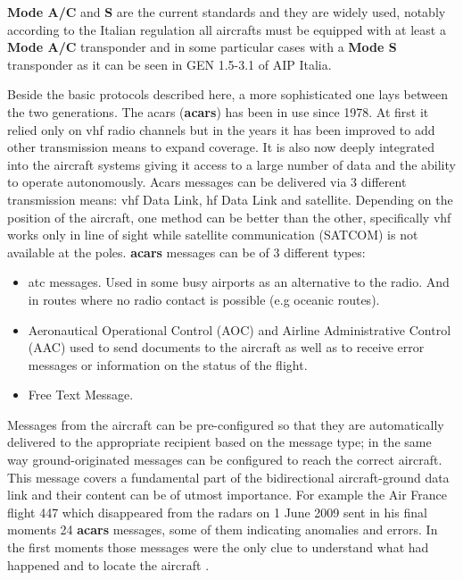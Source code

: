 \documentclass[../main.tex]{subfiles}
\begin{document}
\textbf{Mode A/C} and \textbf{S} are the current standards and they are widely used, notably according to the Italian regulation all aircrafts must be equipped with at least a \textbf{Mode A/C} transponder and in some particular cases with a \textbf{Mode S} transponder as it can be seen in GEN 1.5-3.1 of AIP Italia\cite{itareg}.

Beside the basic protocols described here, a more sophisticated one lays between the two generations.
The \acrlong{acars} (\textbf{\acrshort{acars}}) has been in use since 1978. At first it relied only on \acrshort{vhf} radio channels but in the years it has been improved to add other transmission means to expand coverage. It is also now deeply integrated into the aircraft systems giving it access to a large number of data and the ability to operate autonomously. Acars messages can be delivered via 3 different transmission means: \acrshort{vhf} Data Link, \acrshort{hf} Data Link and satellite. Depending on the position of the aircraft, one method can be better than the other, specifically \acrshort{vhf} works only in line of sight while satellite communication (SATCOM) is not available at the poles. \textbf{\acrshort{acars}} messages can be of 3 different types:
\begin{itemize}
  \item \acrlong{atc} messages. Used in some busy airports as an alternative to the radio. And in routes where no radio contact is possible (e.g oceanic routes).
  \item Aeronautical Operational Control (AOC) and Airline Administrative Control (AAC) used to send documents to the aircraft as well as to receive error messages or information on the status of the flight.
  \item Free Text Message.
\end{itemize}
Messages from the aircraft can be pre-configured so that they are automatically delivered to the appropriate recipient based on the message type; in the same way ground-originated messages can be configured to reach the correct aircraft. This message covers a fundamental part of the bidirectional aircraft-ground data link and their content can be of utmost importance.
For example the Air France flight 447 which disappeared from the radars on 1 June 2009 sent in his final moments 24 \textbf{\acrshort{acars}} messages, some of them indicating anomalies and errors. In the first moments those messages were the only clue to understand what had happened and to locate the aircraft \cite{af447}.
\end{document}
